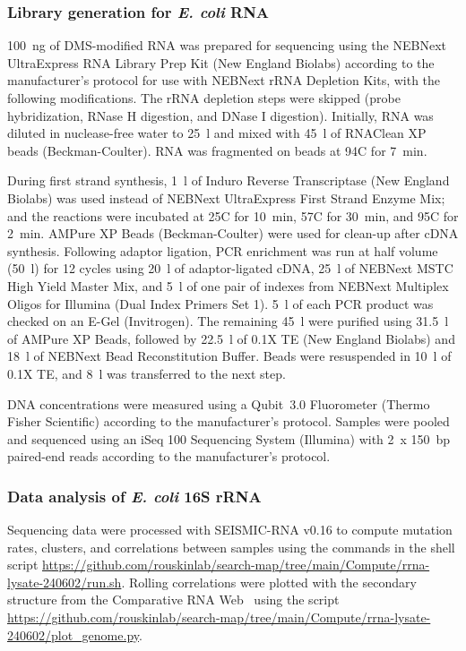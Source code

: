 \documentclass[main.tex]{subfiles}
\begin{document}
\subsubsection{Library generation for \textit{E. coli} RNA}

100~ng of DMS-modified RNA was prepared for sequencing using the NEBNext UltraExpress RNA Library Prep Kit (New England Biolabs) according to the manufacturer’s protocol for use with NEBNext rRNA Depletion Kits, with the following modifications.
The rRNA depletion steps were skipped (probe hybridization, RNase H digestion, and DNase I digestion).
Initially, RNA was diluted in nuclease-free water to 25~\textmu l and mixed with 45~\textmu l of RNAClean XP beads (Beckman-Coulter).
RNA was fragmented on beads at 94\textdegree C for 7~min.

During first strand synthesis, 1~\textmu l of Induro Reverse Transcriptase (New England Biolabs) was used instead of NEBNext UltraExpress First Strand Enzyme Mix; and the reactions were incubated at 25\textdegree C for 10~min, 57\textdegree C for 30~min, and 95\textdegree C for 2~min.
AMPure XP Beads (Beckman-Coulter) were used for clean-up after cDNA synthesis.
Following adaptor ligation, PCR enrichment was run at half volume (50~\textmu l) for 12 cycles using 20~\textmu l of adaptor-ligated cDNA, 25~\textmu l of NEBNext MSTC High Yield Master Mix, and 5~\textmu l of one pair of indexes from NEBNext Multiplex Oligos for Illumina (Dual Index Primers Set 1).
5~\textmu l of each PCR product was checked on an E-Gel (Invitrogen).
The remaining 45~\textmu l were purified using 31.5~\textmu l of AMPure XP Beads, followed by 22.5~\textmu l of 0.1X TE (New England Biolabs) and 18~\textmu l of NEBNext Bead Reconstitution Buffer.
Beads were resuspended in 10~\textmu l of 0.1X TE, and 8~\textmu l was transferred to the next step.

DNA concentrations were measured using a Qubit~3.0 Fluorometer (Thermo Fisher Scientific) according to the manufacturer's protocol.
Samples were pooled and sequenced using an iSeq 100 Sequencing System (Illumina) with 2~x 150~bp paired-end reads according to the manufacturer's protocol.

\subsubsection{Data analysis of \textit{E. coli} 16S rRNA}

Sequencing data were processed with SEISMIC-RNA v0.16 to compute mutation rates, clusters, and correlations between samples using the commands in the shell script \url{https://github.com/rouskinlab/search-map/tree/main/Compute/rrna-lysate-240602/run.sh}.
Rolling correlations were plotted with the secondary structure from the Comparative RNA Web~\cite{Cannone2022} using the script \url{https://github.com/rouskinlab/search-map/tree/main/Compute/rrna-lysate-240602/plot_genome.py}.
\end{document}
